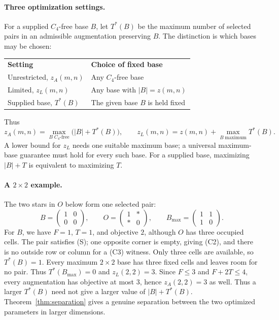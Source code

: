 \documentclass[11pt]{article}
\newcommand{\za}{z_A}
\newcommand{\zl}{z_L}
\begin{document}
\paragraph{Three optimization settings.}
For a supplied $C_4$-free base $B$, let $T^*(B)$ be the maximum number
of selected pairs in an admissible augmentation preserving $B$.
The distinction is which bases may be chosen:
\begin{center}
\begin{tabular}{@{}ll@{}}
\textbf{Setting} & \textbf{Choice of fixed base}\\[2pt]
Unrestricted, $\za(m,n)$ & Any $C_4$-free base\\
Limited, $\zl(m,n)$ & Any base with $|B|=z(m,n)$\\
Supplied base, $T^*(B)$ & The given base $B$ is held fixed
\end{tabular}
\end{center}
Thus
\[
 \za(m,n)=\max_{B\;C_4\text{-free}}\bigl(|B|+T^*(B)\bigr),\qquad
 \zl(m,n)=z(m,n)+\max_{B\;\text{maximum}}T^*(B).
\]
A lower bound for $\zl$ needs one suitable maximum base; a universal
maximum-base guarantee must hold for every such base. For a supplied base,
maximizing $|B|+T$ is equivalent to maximizing $T$.

\paragraph{A $2\times2$ example.}
The two stars in $O$ below form one selected pair:
\[
 B=\begin{pmatrix}1&0\\0&0\end{pmatrix},\qquad
 O=\begin{pmatrix}1&\ast\\\ast&0\end{pmatrix},\qquad
 B_{\max}=\begin{pmatrix}1&1\\1&0\end{pmatrix}.
\]
For $B$, we have $F=1$, $T=1$, and objective $2$, although $O$ has three
occupied cells. The pair satisfies (S); one opposite corner is empty,
giving (C2), and there is no outside row or column for a (C3) witness.
Only three cells are available, so $T^*(B)=1$.
Every maximum $2\times2$ base has three fixed cells and leaves room for
no pair. Thus $T^*(B_{\max})=0$ and $\zl(2,2)=3$.
Since $F\le3$ and $F+2T\le4$, every augmentation has objective at most
$3$, hence $\za(2,2)=3$ as well. Thus a larger $T^*(B)$ need not give a
larger value of $|B|+T^*(B)$. Theorem~\ref{thm:separation} gives a genuine
separation between the two optimized parameters in larger dimensions.
\end{document}
